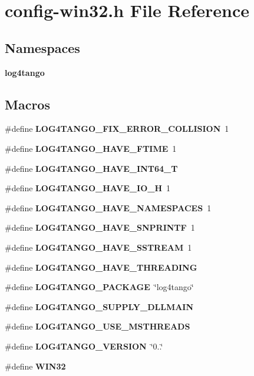 \section{config-\/win32.h File Reference}
\label{config-win32_8h}
\subsection*{Namespaces}
\begin{DoxyCompactItemize}
\item 
{\bf log4tango}
\end{DoxyCompactItemize}
\subsection*{Macros}
\begin{DoxyCompactItemize}
\item 
\#define {\bf L\-O\-G4\-T\-A\-N\-G\-O\-\_\-\-F\-I\-X\-\_\-\-E\-R\-R\-O\-R\-\_\-\-C\-O\-L\-L\-I\-S\-I\-O\-N}~1
\item 
\#define {\bf L\-O\-G4\-T\-A\-N\-G\-O\-\_\-\-H\-A\-V\-E\-\_\-\-F\-T\-I\-M\-E}~1
\item 
\#define {\bf L\-O\-G4\-T\-A\-N\-G\-O\-\_\-\-H\-A\-V\-E\-\_\-\-I\-N\-T64\-\_\-\-T}
\item 
\#define {\bf L\-O\-G4\-T\-A\-N\-G\-O\-\_\-\-H\-A\-V\-E\-\_\-\-I\-O\-\_\-\-H}~1
\item 
\#define {\bf L\-O\-G4\-T\-A\-N\-G\-O\-\_\-\-H\-A\-V\-E\-\_\-\-N\-A\-M\-E\-S\-P\-A\-C\-E\-S}~1
\item 
\#define {\bf L\-O\-G4\-T\-A\-N\-G\-O\-\_\-\-H\-A\-V\-E\-\_\-\-S\-N\-P\-R\-I\-N\-T\-F}~1
\item 
\#define {\bf L\-O\-G4\-T\-A\-N\-G\-O\-\_\-\-H\-A\-V\-E\-\_\-\-S\-S\-T\-R\-E\-A\-M}~1
\item 
\#define {\bf L\-O\-G4\-T\-A\-N\-G\-O\-\_\-\-H\-A\-V\-E\-\_\-\-T\-H\-R\-E\-A\-D\-I\-N\-G}
\item 
\#define {\bf L\-O\-G4\-T\-A\-N\-G\-O\-\_\-\-P\-A\-C\-K\-A\-G\-E}~\char`\"{}log4tango\char`\"{}
\item 
\#define {\bf L\-O\-G4\-T\-A\-N\-G\-O\-\_\-\-S\-U\-P\-P\-L\-Y\-\_\-\-D\-L\-L\-M\-A\-I\-N}
\item 
\#define {\bf L\-O\-G4\-T\-A\-N\-G\-O\-\_\-\-U\-S\-E\-\_\-\-M\-S\-T\-H\-R\-E\-A\-D\-S}
\item 
\#define {\bf L\-O\-G4\-T\-A\-N\-G\-O\-\_\-\-V\-E\-R\-S\-I\-O\-N}~\char`\"{}0..\char`\"{}
\item 
\#define {\bf W\-I\-N32}
\end{DoxyCompactItemize}
